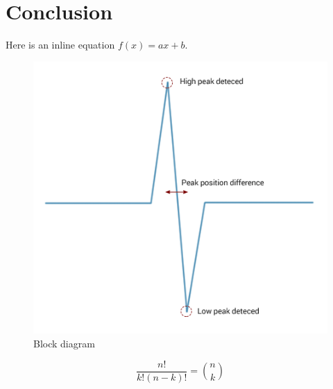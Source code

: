 \graphicspath{{Chapters/Project/}}

\section{Conclusion} %
\label{sec:conclusion}


Here is an inline equation $f(x) = ax+b$. 

\begin{figure}[H]
\centering
\includegraphics[width = 300 pt]{Img/Figures.png}
\caption{Block diagram}
\label{fig:BlockDiagram}
\end{figure}

\begin{equation}
\frac{n!}{k!(n-k)!} = \binom{n}{k}
\label{eq: myequation}
\end{equation}